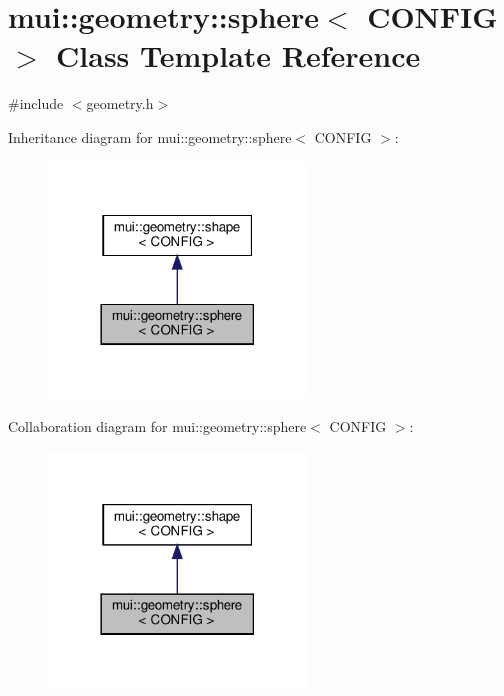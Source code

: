 \hypertarget{classmui_1_1geometry_1_1sphere}{}\section{mui\+:\+:geometry\+:\+:sphere$<$ C\+O\+N\+F\+IG $>$ Class Template Reference}
\label{classmui_1_1geometry_1_1sphere}


{\ttfamily \#include $<$geometry.\+h$>$}



Inheritance diagram for mui\+:\+:geometry\+:\+:sphere$<$ C\+O\+N\+F\+IG $>$\+:
\nopagebreak
\begin{figure}[H]
\begin{center}
\leavevmode
\includegraphics[width=194pt]{classmui_1_1geometry_1_1sphere__inherit__graph}
\end{center}
\end{figure}


Collaboration diagram for mui\+:\+:geometry\+:\+:sphere$<$ C\+O\+N\+F\+IG $>$\+:
\nopagebreak
\begin{figure}[H]
\begin{center}
\leavevmode
\includegraphics[width=194pt]{classmui_1_1geometry_1_1sphere__coll__graph}
\end{center}
\end{figure}
